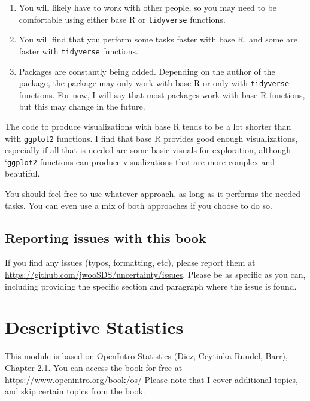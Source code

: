 \documentclass[
]{book}
\providecommand{\tightlist}{%
  \setlength{\itemsep}{0pt}\setlength{\parskip}{0pt}}
\begin{document}
\begin{enumerate}
\def\labelenumi{\arabic{enumi}.}
\tightlist
\item
  You will likely have to work with other people, so you may need to be comfortable using either base R or \texttt{tidyverse} functions.
\item
  You will find that you perform some tasks faster with base R, and some are faster with \texttt{tidyverse} functions.
\item
  Packages are constantly being added. Depending on the author of the package, the package may only work with base R or only with \texttt{tidyverse} functions. For now, I will say that most packages work with base R functions, but this may change in the future.
\end{enumerate}

The code to produce visualizations with base R tends to be a lot shorter than with \texttt{ggplot2} functions. I find that base R provides good enough visualizations, especially if all that is needed are some basic visuals for exploration, although `\texttt{ggplot2} functions can produce visualizations that are more complex and beautiful.

You should feel free to use whatever approach, as long as it performs the needed tasks. You can even use a mix of both approaches if you choose to do so.

\hypertarget{reporting-issues-with-this-book}{%
\section*{Reporting issues with this book}\label{reporting-issues-with-this-book}}

If you find any issues (typos, formatting, etc), please report them at \url{https://github.com/jwooSDS/uncertainty/issues}. Please be as specific as you can, including providing the specific section and paragraph where the issue is found.

\hypertarget{descriptive}{%
\chapter{Descriptive Statistics}\label{descriptive}}

This module is based on OpenIntro Statistics (Diez, Ceytinka-Rundel, Barr), Chapter 2.1. You can access the book for free at \url{https://www.openintro.org/book/os/} Please note that I cover additional topics, and skip certain topics from the book.
\end{document}
